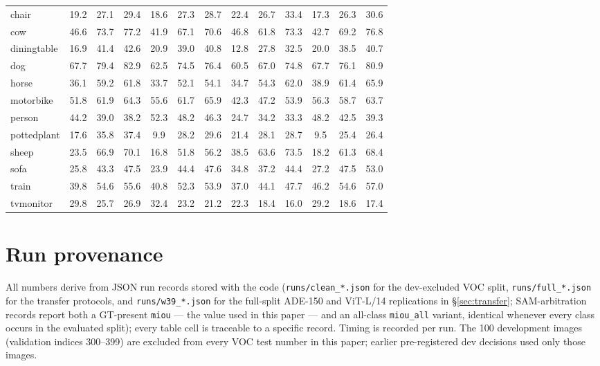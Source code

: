 \documentclass[11pt]{article}
\begin{document}
\begin{table}[h]
\begin{tabular}{lcccccccccccc}
chair & 19.2 & 27.1 & 29.4 & 18.6 & 27.3 & 28.7 & 22.4 & 26.7 & 33.4 & 17.3 & 26.3 & 30.6 \\
cow & 46.6 & 73.7 & 77.2 & 41.9 & 67.1 & 70.6 & 46.8 & 61.8 & 73.3 & 42.7 & 69.2 & 76.8 \\
diningtable & 16.9 & 41.4 & 42.6 & 20.9 & 39.0 & 40.8 & 12.8 & 27.8 & 32.5 & 20.0 & 38.5 & 40.7 \\
dog & 67.7 & 79.4 & 82.9 & 62.5 & 74.5 & 76.4 & 60.5 & 67.0 & 74.8 & 67.7 & 76.1 & 80.9 \\
horse & 36.1 & 59.2 & 61.8 & 33.7 & 52.1 & 54.1 & 34.7 & 54.3 & 62.0 & 38.9 & 61.4 & 65.9 \\
motorbike & 51.8 & 61.9 & 64.3 & 55.6 & 61.7 & 65.9 & 42.3 & 47.2 & 53.9 & 56.3 & 58.7 & 63.7 \\
person & 44.2 & 39.0 & 38.2 & 52.3 & 48.2 & 46.3 & 24.7 & 34.2 & 33.3 & 48.2 & 42.5 & 39.3 \\
pottedplant & 17.6 & 35.8 & 37.4 & 9.9 & 28.2 & 29.6 & 21.4 & 28.1 & 28.7 & 9.5 & 25.4 & 26.4 \\
sheep & 23.5 & 66.9 & 70.1 & 16.8 & 51.8 & 56.2 & 38.5 & 63.6 & 73.5 & 18.2 & 61.3 & 68.4 \\
sofa & 25.8 & 43.3 & 47.5 & 23.9 & 44.4 & 47.6 & 34.8 & 37.2 & 44.4 & 27.2 & 47.5 & 53.0 \\
train & 39.8 & 54.6 & 55.6 & 40.8 & 52.3 & 53.9 & 37.0 & 44.1 & 47.7 & 46.2 & 54.6 & 57.0 \\
tvmonitor & 29.8 & 25.7 & 26.9 & 32.4 & 23.2 & 21.2 & 22.3 & 18.4 & 16.0 & 29.2 & 18.6 & 17.4 \\
\bottomrule
\end{tabular}
\end{table}

\section{Run provenance}
All numbers derive from JSON run records stored with the code
(\texttt{runs/clean\_*.json} for the dev-excluded VOC split,
\texttt{runs/full\_*.json} for the transfer protocols, and
\texttt{runs/w39\_*.json} for the full-split ADE-150 and ViT-L/14 replications
in \S\ref{sec:transfer}; SAM-arbitration records report both a GT-present
\texttt{miou} --- the value used in this paper --- and an all-class
\texttt{miou\_all} variant, identical whenever every class occurs in the
evaluated split); every table cell is traceable
to a specific record. Timing is recorded per run. The 100 development images
(validation indices 300--399) are excluded from every VOC test number in this paper;
earlier pre-registered dev decisions used only those images.
\end{document}
